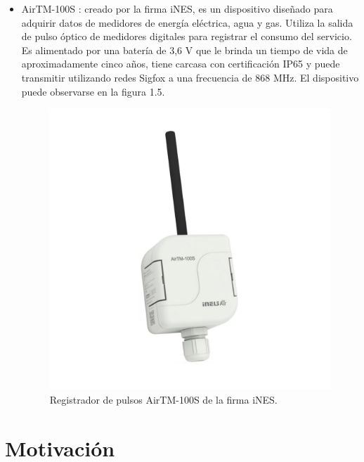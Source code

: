 \begin{itemize}

	\item AirTM-100S \citep{WEBSITE:7}: creado por la firma iNES, es un dispositivo diseñado para adquirir datos de medidores de energía eléctrica, agua y gas. Utiliza la salida de pulso óptico de medidores digitales para registrar el consumo del servicio. Es alimentado por una batería de 3,6 V que le brinda un tiempo de vida de aproximadamente cinco años, tiene carcasa con certificación IP65 y puede transmitir utilizando redes Sigfox \citep{WEBSITE:13} a una frecuencia de 868 MHz. El dispositivo puede observarse en la figura 1.5.
	
	\begin{figure}[h]
		\centering
		\includegraphics[scale=0.4]{./Figures/airtm-100s.pdf}
		\caption{Registrador de pulsos AirTM-100S de la firma iNES\protect\footnotemark.}
		\label{fig:cuadradoAzul}
	\end{figure}	
\end{itemize}



\section{Motivación}

